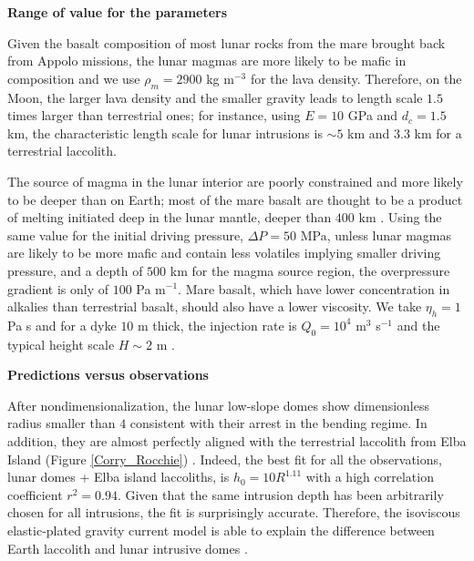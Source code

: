 \vspace{.5cm} \textbf{Range of value for the parameters} \vspace{.5cm}

Given the basalt composition of most lunar rocks from the mare brought
back from  Appolo missions,  the lunar  magmas are  more likely  to be
mafic in  composition and we use  $\rho_m = 2900$ kg  m$^{-3}$ for the
lava density. Therefore, on the Moon,  the larger lava density and the
smaller  gravity  leads  to  length  scale  $1.5$  times  larger  than
terrestrial ones; for  instance, using $E=10$ GPa and $d_c  = 1.5$ km,
the characteristic  length scale for  lunar intrusions is $\sim  5$ km
and $3.3$ km for a terrestrial laccolith.

The source of  magma in the lunar interior are  poorly constrained and
more likely to  be deeper than on  Earth; most of the  mare basalt are
thought to be a product of melting initiated deep in the lunar mantle,
deeper than $400$ km \citep{Shearer:2006gg}.  Using the same value for
the initial driving pressure, $\Delta P = 50$ MPa, unless lunar magmas
are  likely to  be  more  mafic and  contain  less volatiles  implying
smaller driving pressure, and a depth of $500$ km for the magma source
region, the overpressure  gradient is only of $100$  Pa m$^{-1}$. Mare
basalt, which  have lower  concentration in alkalies  than terrestrial
basalt, should also  have a lower viscosity.  We take  $\eta_h=1$ Pa s
and  for a  dyke  $10$ m  thick, the  injection  rate is  $Q_0=10^{4}$
m$^{3}$ s$^{-1}$ and the typical height scale $H\sim 2$ m .

\vspace{.5cm} \textbf{Predictions versus observations} \vspace{.5cm}

After   nondimensionalization,   the   lunar  low-slope   domes   show
dimensionless radius smaller than $4$  consistent with their arrest in
the bending  regime. In  addition, they  are almost  perfectly aligned
with   the   terrestrial   laccolith    from   Elba   Island   (Figure
\ref{Corry_Rocchie}) \citep{Michaut:2011kg}. Indeed,  the best fit for
all  the  observations,  lunar  domes +  Elba  island  laccoliths,  is
$h_0   =    10R^{1.11}$   with   a   high    correlation   coefficient
$r^2=0.94$. Given that  the same intrusion depth  has been arbitrarily
chosen  for   all  intrusions,  the  fit   is  surprisingly  accurate.
Therefore, the isoviscous elastic-plated gravity current model is able
to explain the difference between  Earth laccolith and lunar intrusive
domes \citep{Michaut:2011kg}.

